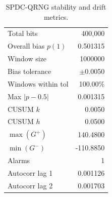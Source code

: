 \begin{table}[t]
\centering
\caption{SPDC-QRNG stability and drift metrics.}
\label{tab:qrng_metrics}
\begin{tabular}{l r}
\hline
Total bits & 400,000 \\
Overall bias $p(1)$ & 0.501315 \\
Window size & 1000000 \\
Bias tolerance & $\pm$0.0050 \\
Windows within tol & 100.00\% \\
Max $|p-0.5|$ & 0.001315 \\
CUSUM $k$ & 0.0050 \\
CUSUM $h$ & 0.0500 \\
$\max(G^+)$ & 140.4800 \\
$\min(G^-)$ & -110.8850 \\
Alarms & 1 \\
Autocorr lag 1 & 0.001126 \\
Autocorr lag 2 & 0.001703 \\
\hline
\end{tabular}
\end{table}